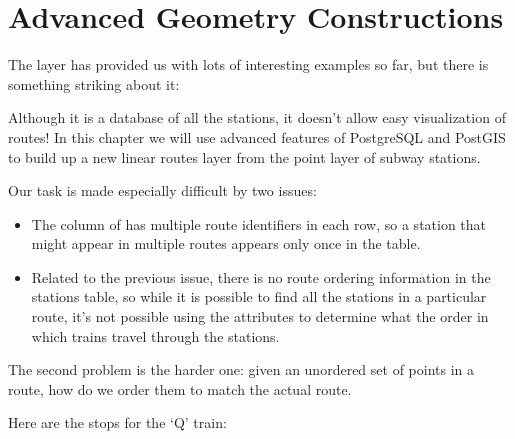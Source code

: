 \documentclass[a4paper,11pt,english]{sphinxmanual}
\begin{document}
\section{Advanced Geometry Constructions}
\label{\detokenize{advanced:advanced-geometry-constructions}}\label{\detokenize{advanced:advanced-geometry-construction}}
The  layer has provided us with lots of interesting examples so far, but there is something striking about it:

\noindent{}

Although it is a database of all the stations, it doesn’t allow easy visualization of routes! In this chapter we will use advanced features of PostgreSQL and PostGIS to build up a new linear routes layer from the point layer of subway stations.

Our task is made especially difficult by two issues:
\begin{itemize}
\item {} 
The  column of  has multiple route identifiers in each row, so a station that might appear in multiple routes appears only once in the table.

\item {} 
Related to the previous issue, there is no route ordering information in the stations table, so while it is possible to find all the stations in a particular route, it’s not possible using the attributes to determine what the order in which trains travel through the stations.

\end{itemize}

The second problem is the harder one: given an unordered set of points in a route, how do we order them to match the actual route.

Here are the stops for the ‘Q’ train:

\begin{sphinxVerbatim}[commandchars=\\\{\}]
  
  
    
\end{sphinxVerbatim}
\end{document}
